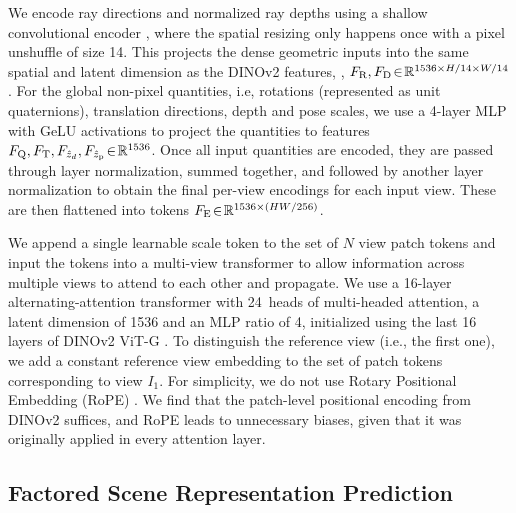 We encode ray directions and normalized ray depths using a shallow convolutional encoder \cite{MouWXWZQSQ2024}, where the spatial resizing only happens once with a pixel unshuffle of size 14.
This projects the dense geometric inputs into the same spatial and latent dimension as the DINOv2 features, \ie, $F_\text{R}, F_\text{D} \!\in\! \mathbb{R}^{1536 \times H/14 \times W/14}$.
For the global non-pixel quantities, i.e, rotations (represented as unit quaternions), translation directions, depth and pose scales, we use a 4-layer MLP with GeLU activations to project the quantities to features $F_\text{Q}, F_\text{T}, F_{\hat{z}_d}, F_{\hat{z}_\text{p}} \!\in\! \mathbb{R}^{1536}$.
Once all input quantities are encoded, they are passed through layer normalization, summed together, and followed by another layer normalization to obtain the final per-view encodings for each input view.
These are then flattened into tokens $F_\text{E} \!\in\! \mathbb{R}^{1536 \times ({HW}/{256})}$.


We append a single learnable scale token to the set of $N$ view patch tokens and input the tokens into a multi-view transformer to allow information across multiple views to attend to each other and propagate. 
We use a 16-layer alternating-attention transformer \cite{WangCKVRN2025} with 24~heads of multi-headed attention, a latent dimension of 1536 and an MLP ratio of 4, initialized using the last 16 layers of DINOv2 ViT-G \cite{oquab2023dinov2, lin2025depth}.
To distinguish the reference view (i.e., the first one), we add a constant reference view embedding to the set of patch tokens corresponding to view $I_{1}$.
For simplicity, we do not use Rotary Positional Embedding (RoPE) \cite{SuLPMWL2024}.
We find that the patch-level positional encoding from DINOv2 suffices, and RoPE leads to unnecessary biases, given that it was originally applied in every attention layer.

\subsection{Factored Scene Representation Prediction}


